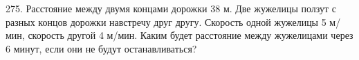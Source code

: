 275. Расстояние между двумя концами дорожки 38 м. Две жужелицы ползут с разных концов дорожки навстречу друг другу. Скорость одной жужелицы 5 м/мин, скорость другой 4 м/мин. Каким будет расстояние между жужелицами через 6 минут, если они не будут останавливаться?\\
